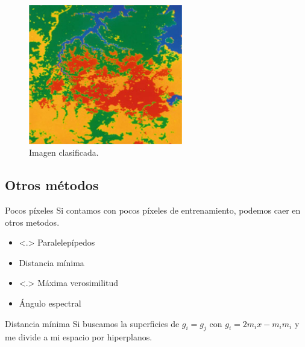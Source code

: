 \documentclass[]{beamer}
\begin{document}
\begin{frame}{\subsecname}
  \begin{figure}
  \includegraphics[width=0.6\textwidth]{imagenes/t_map.png}
  \caption{Imagen clasificada.}
  \end{figure}
\end{frame}

\subsection{Otros métodos}
\begin{frame}{\subsecname}
  \begin{block}{Pocos píxeles}
    Si contamos con pocos píxeles de entrenamiento, podemos caer en otros metodos.
    \begin{itemize}
      \item<.> Paralelepípedos
      \item<1> Distancia mínima
      \item<.> Máxima verosimilitud
      \item<1> Ángulo espectral
    \end{itemize}
  \end{block}
\end{frame}

\begin{frame}{\subsecname}
  \begin{block}{Distancia mínima}
    Si buscamos la superficies de $g_i = g_j$ con $g_i = 2 m_i x - m_i m_i$
    y me divide a mi espacio por hiperplanos.
  \end{block}
\end{frame}
\end{document}

